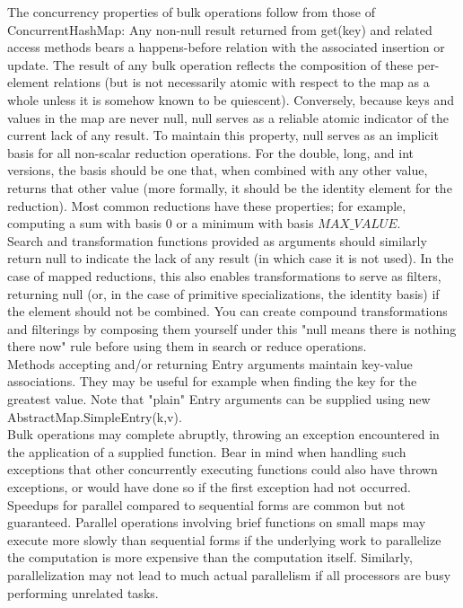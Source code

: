 \documentclass[UTF8,11pt]{ctexbook}
\begin{document}
	The concurrency properties of bulk operations follow from those of ConcurrentHashMap: Any non-null result returned from get(key) and related access methods bears a happens-before relation with the associated insertion or update. The result of any bulk operation reflects the composition of these per-element relations (but is not necessarily atomic with respect to the map as a whole unless it is somehow known to be quiescent). Conversely, because keys and values in the map are never null, null serves as a reliable atomic indicator of the current lack of any result. To maintain this property, null serves as an implicit basis for all non-scalar reduction operations. For the double, long, and int versions, the basis should be one that, when combined with any other value, returns that other value (more formally, it should be the identity element for the reduction). Most common reductions have these properties; for example, computing a sum with basis 0 or a minimum with basis $MAX\_VALUE$.\\
	
	Search and transformation functions provided as arguments should similarly return null to indicate the lack of any result (in which case it is not used). In the case of mapped reductions, this also enables transformations to serve as filters, returning null (or, in the case of primitive specializations, the identity basis) if the element should not be combined. You can create compound transformations and filterings by composing them yourself under this "null means there is nothing there now" rule before using them in search or reduce operations.\\
	
	Methods accepting and/or returning Entry arguments maintain key-value associations. They may be useful for example when finding the key for the greatest value. Note that "plain" Entry arguments can be supplied using new AbstractMap.SimpleEntry(k,v).\\
	
	Bulk operations may complete abruptly, throwing an exception encountered in the application of a supplied function. Bear in mind when handling such exceptions that other concurrently executing functions could also have thrown exceptions, or would have done so if the first exception had not occurred.\\
	
	Speedups for parallel compared to sequential forms are common but not guaranteed. Parallel operations involving brief functions on small maps may execute more slowly than sequential forms if the underlying work to parallelize the computation is more expensive than the computation itself. Similarly, parallelization may not lead to much actual parallelism if all processors are busy performing unrelated tasks.\\
	
\end{document}
